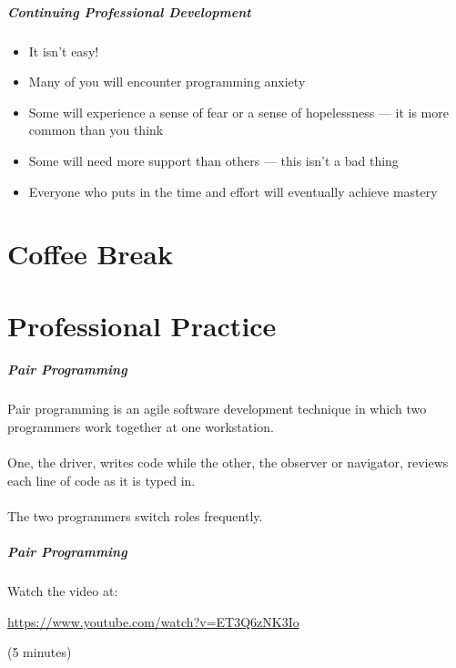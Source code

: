 \begin{frame}
	\frametitle{Continuing Professional Development}
	
	\begin{itemize}
		\item It isn't easy!
		\item Many of you will encounter programming anxiety
		\item Some will experience a sense of fear or a sense of hopelessness --- it is more common than you think
		\item Some will need more support than others --- this isn't a bad thing
		\item Everyone who puts in the time and effort will eventually achieve mastery
	\end{itemize}
\end{frame}





\part{Coffee Break}

\part{Professional Practice}
\frame{\partpage}

\begin{frame}
	\frametitle{Pair Programming}
		
	Pair programming is an agile software development technique in which two programmers work together 
	at one workstation. 
	\\~\\
	One, the driver, writes code while the other, the observer or navigator, reviews 
	each line of code as it is typed in. 
	\\~\\
	The two programmers switch roles frequently.
	
\end{frame}

\begin{frame}
	\frametitle{Pair Programming}
	
	Watch the video at:
	
	\vspace{1.5em}
		
	\url{https://www.youtube.com/watch?v=ET3Q6zNK3Io}
	
	\vspace{1em}
		
	(5 minutes)
	
\end{frame}

